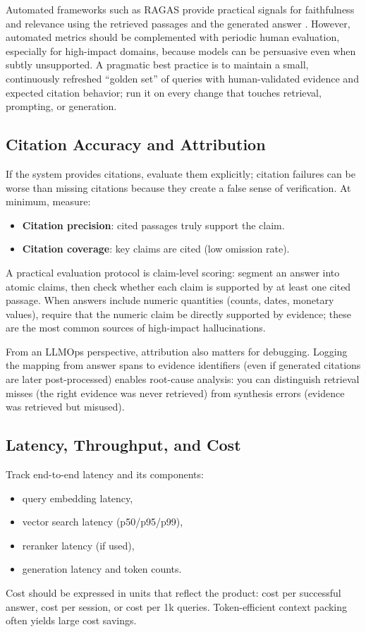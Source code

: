 Automated frameworks such as RAGAS provide practical signals for faithfulness and relevance using the retrieved passages and the generated answer \cite{ragas_eacl2024}. However, automated metrics should be complemented with periodic human evaluation, especially for high-impact domains, because models can be persuasive even when subtly unsupported. A pragmatic best practice is to maintain a small, continuously refreshed ``golden set'' of queries with human-validated evidence and expected citation behavior; run it on every change that touches retrieval, prompting, or generation.

\subsection{Citation Accuracy and Attribution}
If the system provides citations, evaluate them explicitly; citation failures can be worse than missing citations because they create a false sense of verification. At minimum, measure:
\begin{itemize}
    \item \textbf{Citation precision}: cited passages truly support the claim.
    \item \textbf{Citation coverage}: key claims are cited (low omission rate).
\end{itemize}

A practical evaluation protocol is claim-level scoring: segment an answer into atomic claims, then check whether each claim is supported by at least one cited passage. When answers include numeric quantities (counts, dates, monetary values), require that the numeric claim be directly supported by evidence; these are the most common sources of high-impact hallucinations.

From an LLMOps perspective, attribution also matters for debugging. Logging the mapping from answer spans to evidence identifiers (even if generated citations are later post-processed) enables root-cause analysis: you can distinguish retrieval misses (the right evidence was never retrieved) from synthesis errors (evidence was retrieved but misused).

\subsection{Latency, Throughput, and Cost}
Track end-to-end latency and its components:
\begin{itemize}
    \item query embedding latency,
    \item vector search latency (p50/p95/p99),
    \item reranker latency (if used),
    \item generation latency and token counts.
\end{itemize}
Cost should be expressed in units that reflect the product: cost per successful answer, cost per session, or cost per 1k queries. Token-efficient context packing often yields large cost savings.

